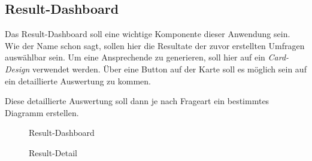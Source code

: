 \subsection{Result-Dashboard}
\label{ssec:konzept:client:dashboard}

Das Result-Dashboard soll eine wichtige Komponente dieser Anwendung sein. 
Wie der Name schon sagt, sollen hier die Resultate der zuvor erstellten Umfragen auswählbar sein. 
Um eine Ansprechende  zu generieren, soll hier auf ein \emph{Card-Design} verwendet werden. 
Über eine Button auf der Karte soll es möglich sein auf ein detaillierte Auswertung zu kommen. 

Diese detaillierte Auswertung soll dann je nach Frageart ein bestimmtes Diagramm erstellen. 

\begin{figure}
	\caption[Result-Dashboard]{Result-Dashboard \\ \quelle}
	\label{fig:MockResultDashboard}
\end{figure}

\begin{figure}
	\caption[Result-Detail]{Result-Detail \\ \quelle}
	\label{fig:MockResultDetail}
\end{figure}
